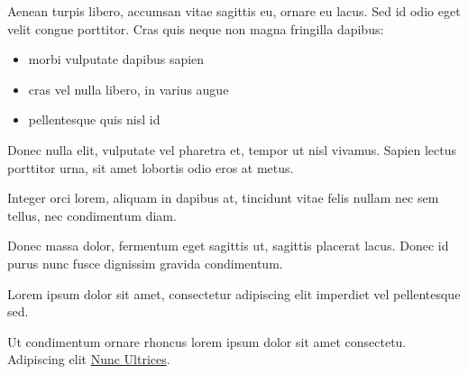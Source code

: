 \documentclass[10pt]{article} %
\begin{document}
\begin{minipage}[t]{.66\linewidth}

\hypertarget{secondnews}{} %

Aenean turpis libero, accumsan vitae sagittis eu, ornare eu lacus. Sed id odio eget velit congue porttitor. Cras quis neque non magna fringilla dapibus:

\begin{itemize}
\item morbi vulputate dapibus sapien
\item cras vel nulla libero, in varius augue
\item pellentesque quis nisl id 
\end{itemize}

Donec nulla elit, vulputate vel pharetra et, tempor ut nisl vivamus. Sapien lectus porttitor urna, sit amet lobortis odio eros at metus.

Integer orci lorem, aliquam in dapibus at, tincidunt vitae felis nullam nec sem tellus, nec condimentum diam.

Donec massa dolor, fermentum eget sagittis ut, sagittis placerat lacus. Donec id purus nunc fusce dignissim gravida condimentum. 

Lorem ipsum dolor sit amet, consectetur adipiscing elit imperdiet vel pellentesque sed.

Ut condimentum ornare rhoncus lorem ipsum dolor sit amet consectetu. Adipiscing elit \href{http://www.example.com}{Nunc Ultrices}.

\end{minipage} %

\end{document}
